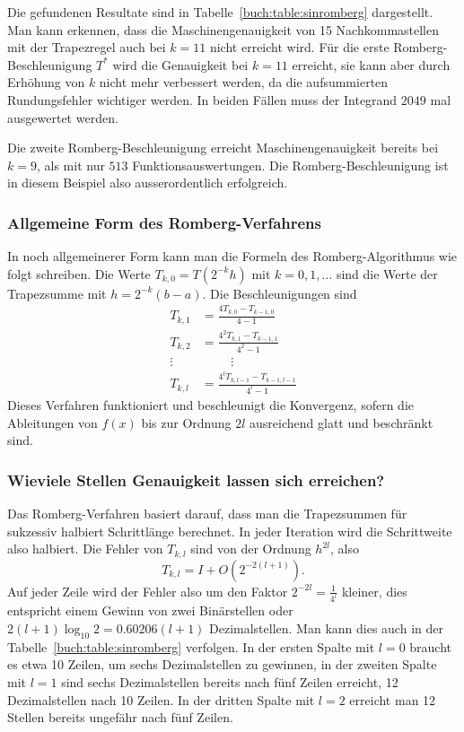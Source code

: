 Die gefundenen Resultate sind in Tabelle~\ref{buch:table:sinromberg}
dargestellt.
Man kann erkennen, dass die Maschinengenauigkeit von 15 Nachkommastellen
mit der Trapezregel auch bei $k=11$  nicht erreicht wird.
Für die erste Romberg-Beschleunigung $T^*$ wird die Genauigkeit
bei $k=11$ erreicht, sie kann aber durch Erhöhung von $k$ nicht
mehr verbessert werden, da die aufsummierten Rundungsfehler
wichtiger werden.
In beiden Fällen muss der Integrand $2049$ mal ausgewertet werden.

Die zweite Romberg-Beschleunigung erreicht Maschinengenauigkeit bereits bei
$k=9$, als mit nur $513$ Funktionsauswertungen.
Die Romberg-Beschleunigung ist in diesem Beispiel also ausserordentlich
erfolgreich.

\subsubsection{Allgemeine Form des Romberg-Verfahrens}
In noch allgemeinerer Form kann man die Formeln des Romberg-Algorithmus
wie folgt schreiben.
Die Werte 
$T_{k,0} = T(2^{-k}h)$ mit $k=0,1,\dots$
sind die Werte der Trapezsumme mit $h=2^{-k}(b-a)$.
Die Beschleunigungen sind
\begin{align*}
T_{k,1} &= \frac{4T_{k,0}-T_{k-1,0}}{4-1} \\
T_{k,2} &= \frac{4^2T_{k,1}-T_{k-1,1}}{4^2-1}\\
\vdots\quad&\hspace{1cm} \vdots\\
T_{k,l} &= \frac{4^lT_{k,l-1}-T_{k-1,l-1}}{4^l-1}
\end{align*}
Dieses Verfahren funktioniert und beschleunigt die Konvergenz,
sofern die Ableitungen von $f(x)$ bis zur Ordnung $2l$ ausreichend glatt
und beschränkt sind.

\subsubsection{Wieviele Stellen Genauigkeit lassen sich erreichen?}
%
Das Romberg-Verfahren basiert darauf, dass man die Trapezsummen 
für sukzessiv halbiert Schrittlänge berechnet.
In jeder Iteration wird die Schrittweite also halbiert.
Die Fehler von $T_{k,l}$ sind von der Ordnung $h^{2l}$, also
\[
T_{k,l} = I + O(2^{-2(l+1)}).
\]
Auf jeder Zeile wird der Fehler also um den Faktor
$2^{-2l}=\frac1{4^l}$ kleiner,
dies entspricht einem Gewinn von zwei Binärstellen oder 
$2(l+1)\log_{10}2=0.60206(l+1)$ Dezimalstellen.
Man kann dies auch in der Tabelle~\ref{buch:table:sinromberg}
verfolgen.
In der ersten Spalte mit $l=0$ braucht es etwa 10 Zeilen,
um sechs Dezimalstellen
zu gewinnen, in der zweiten Spalte mit $l=1$ sind sechs Dezimalstellen
bereits nach fünf Zeilen erreicht, 12 Dezimalstellen nach 10 Zeilen.
In der dritten Spalte mit $l=2$ erreicht man 12 Stellen bereits ungefähr
nach fünf Zeilen.



